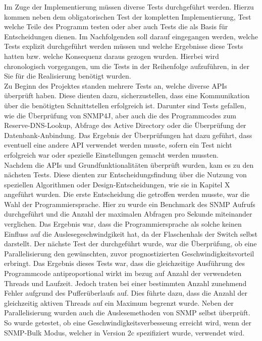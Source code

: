 Im Zuge der Implementierung müssen diverse Tests durchgeführt werden. Hierzu kommen neben dem obligatorischen Test der kompletten Implementierung, Test welche Teile des Programm testen oder aber auch Tests die als Basis für Entscheidungen dienen.
Im Nachfolgenden soll darauf eingegangen werden, welche Tests explizit durchgeführt werden müssen und welche Ergebnisse diese Tests hatten bzw. welche Konsequenz daraus gezogen wurden. Hierbei wird chronologisch vorgegangen, um die Tests in der Reihenfolge aufzuführen, in der Sie für die Realisierung benötigt wurden.\\
Zu Beginn des Projektes standen mehrere Tests an, welche diverse APIs überprüft haben. Diese dienten dazu, sicherzustellen, dass eine Kommunikation über die benötigten Schnittstellen erfolgreich ist. Darunter sind Tests gefallen, wie die Überprüfung von SNMP4J, aber auch die des Programmcodes zum Reserve-DNS-Lookup, Abfrage des Active Directory oder die  Überprüfung der Datenbank-Anbindung. Das Ergebnis der Überprüfungen hat dazu geführt, dass eventuell eine andere API verwendet werden musste, sofern ein Test nicht erfolgreich war oder spezielle Einstellungen gemacht werden mussten.\\
Nachdem die APIs und Grundfunktionalitäten überprüft wurden, kam es zu den nächsten Tests. Diese dienten zur Entscheidungsfindung über die Nutzung von speziellen Algorithmen oder Design-Entscheidungen, wie sie in Kapitel X angeführt wurden.
Die erste Entscheidung die getroffen werden musste, war die Wahl der Programmiersprache. Hier zu wurde ein Benchmark des SNMP Aufrufs durchgeführt und die Anzahl der maximalen  Abfragen pro Sekunde miteinander verglichen. Das Ergebnis war, dass die Programmiersprache als solche keinen Einfluss auf die Auslesegeschwindgikeit hat, da der Flaschenhals der Switch selbst darstellt. Der nächste Test der durchgeführt wurde, war die Überprüfung, ob eine Parallelisierung den gewünschten, zuvor prognostizierten Geschwindigkeitsvorteil erbringt. Das Ergebnis dieses Tests war, dass die gleichzeitige Ausführung des Programmcode antiproportional wirkt im bezug auf Anzahl der verwendeten Threads und Laufzeit. Jedoch traten bei einer bestimmten Anzahl zunehmend Fehler aufgrund des Pufferüberlaufs auf. Dies führte dazu, dass die Anzahl der gleichzeitig aktiven Threads auf ein Maximum begrenzt wurde. Neben der Parallelisierung wurden auch die Auslesemethoden von SNMP selbst überprüft. So wurde getestet, ob eine Geschwindigkeitsverbesseung erreicht wird, wenn der SNMP-Bulk Modus, welcher in Version 2c spezifiziert wurde, verwendet wird.
